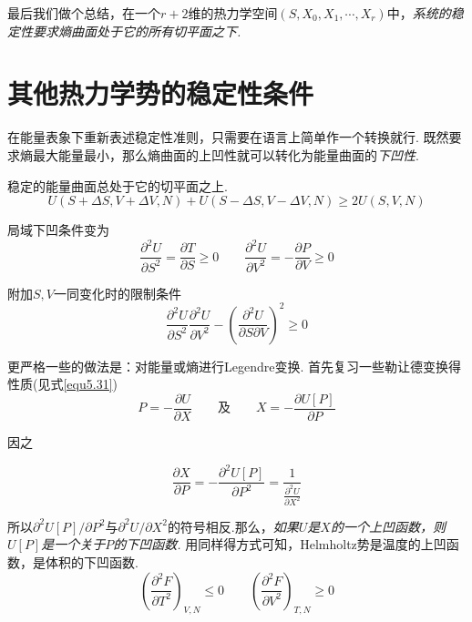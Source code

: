 最后我们做个总结，在一个$r+2$维的热力学空间$(S,X_0,X_1,\cdots,X_r)$中，{\it 系统的稳定性要求熵曲面处于它的所有切平面之下.}



\section{其他热力学势的稳定性条件}\label{sec3.2}
在能量表象下重新表述稳定性准则，只需要在语言上简单作一个转换就行. 既然要求熵最大能量最小，那么熵曲面的上凹性就可以转化为能量曲面的{\it 下凹性}.

稳定的能量曲面总处于它的切平面之上.
\begin{equation}
\label{equ8.8}
U(S+\Delta S,V+\Delta V,N)+U(S-\Delta S,V-\Delta V,N)\geq 2U(S,V,N)
\end{equation}

局域下凹条件变为
\begin{equation}
\label{equ8.9}
\frac{\partial^2U}{\partial S^2}=\frac{\partial T}{\partial S}\geq 0\qquad \frac{\partial^2U}{\partial V^2}=-\frac{\partial P}{\partial V}\geq 0
\end{equation}

附加$S,V$一同变化时的限制条件
\begin{equation}
\label{equ8.10}
\frac{\partial^2U}{\partial S^2}\frac{\partial^2U}{\partial V^2}-\left(\frac{\partial^2U}{\partial S\partial V}\right)^2\geq 0
\end{equation}

更严格一些的做法是：对能量或熵进行Legendre变换. 首先复习一些勒让德变换得性质(见式\eqref{equ5.31})
\begin{equation}
\label{equ8.11}
P=-\frac{\partial U}{\partial X}\qquad\text{及}\qquad X=-\frac{\partial U[P]}{\partial P}
\end{equation}

因之

\begin{equation}
\label{equ8.12}
\frac{\partial X}{\partial P}=-\frac{\partial^2U[P]}{\partial　P^2}=\dfrac{1}{\frac{\partial^2U}{\partial X^2}}
\end{equation}

所以$\partial^2U[P]/\partial P^2$与$\partial^2U/\partial X^2$的符号相反.那么，{\it 如果$U$是$X$的一个上凹函数，则$U[P]$是一个关于$P$的下凹函数.} 用同样得方式可知，Helmholtz势是温度的上凹函数，是体积的下凹函数.
\begin{equation}
\label{equ8.13}
\left(\frac{\partial^2 F}{\partial T^2}\right)_{V,N}\leq 0\qquad \left(\frac{\partial^2 F}{\partial V^2}\right)_{T,N}\geq 0
\end{equation}

